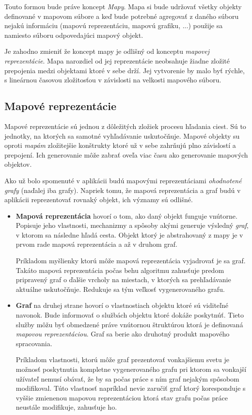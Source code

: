 Touto formou bude práve koncept \textit{Mapy}. Mapa si bude udržovať všetky objekty definované v mapovom súbore a keď bude potrebné agregovať z daného súboru nejakú informáciu (mapovú reprezentáciu, mapovú grafiku, ...) použije sa namiesto súboru odpovedajúci mapový objekt.

Je zahodno zmieniť že koncept mapy je odlišný od konceptu \textit{mapovej reprezentácie}. Mapa narozdiel od jej reprezentácie neobsahuje žiadne zložité prepojenia medzi objektami ktoré v sebe drží. Jej vytvorenie by malo byť rýchle, s lineárnou časovou zložitosťou v závislosti na velkosti mapového súboru.

\subsection{Mapové reprezentácie}

Mapové reprezentácie sú jednou z dôležitých zložiek procesu hľadania ciest. Sú to jednotky, na ktorých sa samotné vyhľadávanie uskutočňuje. Mapové objekty su oproti \textit{mapám} zložitejšie konštrukty ktoré už v sebe zahrňujú plno závislostí a prepojení. Ich generovanie môže zabrať oveľa viac času ako generovanie mapových objektov. 

Ako už bolo spomenuté v aplikácii budú mapovými reprezentáciami \textit{ohodnotené grafy} (naďalej iba grafy). Napriek tomu, že mapová reprezentácia a graf budú v aplikácii reprezentovať rovnaký objekt, ich významy sú odlišné.

\begin{itemize}
    \item \textbf{Mapová reprezentácia} hovorí o tom, ako daný objekt funguje vnútorne. Popisuje jeho vlastnosti, mechanizmy a spôsoby akými generuje výsledný \textit{graf}, v ktorom sa následne hľadá cesta. Objekt ktorý je abstrahovaný z mapy je v prvom rade mapová reprezentácia a až v druhom graf.
    
    Príkladom myšlienky ktorú môže mapová reprezentácia vyjadrovať je  sa graf. Takáto mapová reprezentácia počas behu algoritmu zahusťuje predom pripravený graf o ďalšie vrcholy na miestach, v ktorých sa prehľadávanie aktuálne uskutočňuje. Redukuje sa tým veľkosť vygenerovaného grafu.   
    \item\textbf{Graf} na druhej strane hovorí o vlastnostiach objektu ktoré sú viditeľné navonok. Bude informovať o  službách objektu ktoré dokáže poskytnúť. Tieto služby môžu byť obmedzené práve vnútornou štruktúrou ktorá je definovaná \textit{mapovou reprezentáciou}. Graf sa berie ako druhotný produkt mapového spracovania.   

    Príkladom vlastnosti, ktorú môže graf prezentovať vonkajšiemu svetu je možnosť poskytnutia kompletne vygenerovaného grafu pri ktorom sa vonkajší užívateľ nemusí obávať, že by sa počas práce s ním graf nejakým spôsobom modifikoval. Túto vlastnosť napríklad nevie zaručiť graf ktorý koresponduje s vyššie zmienenou mapovou reprezentáciou ktorá stav grafu počas práce neustále modifikuje, zahusťuje ho.
\end{itemize}

